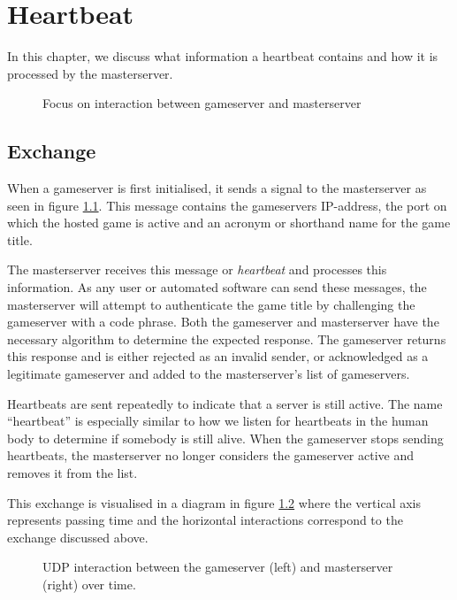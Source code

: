 \chapter{Heartbeat}
\label{chap:heartbeat}

In this chapter, we discuss what information a heartbeat contains and how it is processed by the masterserver.

\begin{figure}[ht]
\centering

\caption{Focus on interaction between gameserver and masterserver}\label{fig:overviewhb}
\end{figure}

\section{Exchange}
When a gameserver is first initialised, it sends a signal to the masterserver as seen in figure \ref{fig:overviewhb}. This message contains the gameservers IP-address, the port on which the hosted game is active and an acronym or shorthand name for the game title.

The masterserver receives this message or \emph{heartbeat} and processes this information. As any user or automated software can send these messages, the masterserver will attempt to authenticate the game title by challenging the gameserver with a code phrase. Both the gameserver and masterserver have the necessary algorithm to determine the expected response. The gameserver returns this response and is either rejected as an invalid sender, or acknowledged as a legitimate gameserver and added to the masterserver's list of gameservers. 

Heartbeats are sent repeatedly to indicate that a server is still active. The name ``heartbeat'' is especially similar to how we listen for heartbeats in the human body to determine if somebody is still alive. When the gameserver stops sending heartbeats, the masterserver no longer considers the gameserver active and removes it from the list.

This exchange is visualised in a diagram in figure \ref{fig:heartbeat} where the vertical axis represents passing time and the horizontal interactions correspond to the exchange discussed above.

\begin{figure}[ht]
\centering

\caption{UDP interaction between the gameserver (left) and masterserver (right) over time.}
\label{fig:heartbeat}
\end{figure}

